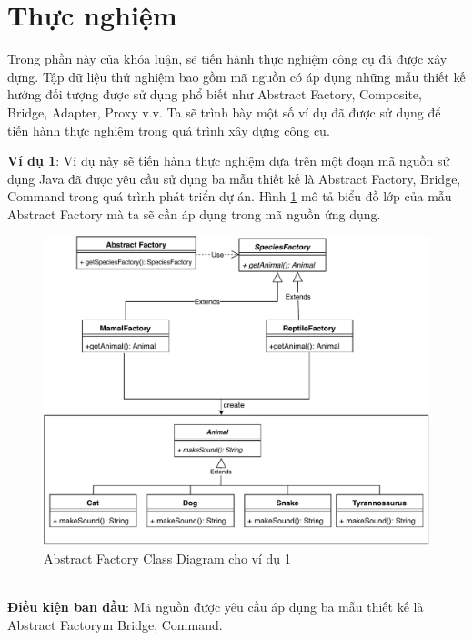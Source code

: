 \documentclass[12pt]{report}
\begin{document}
\section{Thực nghiệm}
Trong phần này của khóa luận, sẽ tiến hành thực nghiệm công cụ đã được xây dựng. Tập dữ liệu thử nghiệm bao gồm mã nguồn có áp dụng những mẫu thiết kế hướng đối tượng được sử dụng phổ biết như Abstract Factory, Composite, Bridge, Adapter, Proxy v.v.
\noindent Ta sẽ trình bày một số ví dụ đã được sử dụng để tiến hành thực nghiệm trong quá trình xây dựng công cụ.

\noindent \textbf{Ví dụ 1}: Ví dụ này sẽ tiến hành thực nghiệm dựa trên một đoạn mã nguồn sử dụng Java đã được yêu cầu sử dụng ba mẫu thiết kế là Abstract Factory, Bridge, Command trong quá trình phát triển dự án. Hình \ref{fig:abstract_factory_diagram} mô tả biểu đồ lớp của mẫu Abstract Factory mà ta sẽ cần áp dụng trong mã nguồn ứng dụng.
\begin{figure}[h]
	\centering
	\includegraphics[scale=0.31]{images/_abstract_factory}
	\caption{Abstract Factory Class Diagram cho ví dụ 1}
	\label{fig:abstract_factory_diagram}
\end{figure}\\
\noindent \textbf{Điều kiện ban đầu}: Mã nguồn được yêu cầu áp dụng ba mẫu thiết kế là Abstract Factorym Bridge, Command.
\end{document}
